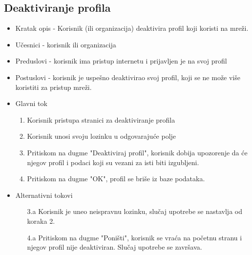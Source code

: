 \subsection{Deaktiviranje profila}
\begin{itemize}
	\item Kratak opis - Korisnik (ili organizacija) deaktivira profil koji koristi na mreži.
	\item Učesnici - korisnik ili organizacija
	\item Preduslovi - korisnik ima pristup internetu i prijavljen je na svoj profil
	\item Postuslovi - korisnik je uspešno deaktivirao svoj profil, koji se ne može više koristiti za pristup mreži.
	\item Glavni tok
		\begin{enumerate}
			\item Korisnik pristupa stranici za deaktiviranje profila
			\item Korisnik unosi svoju lozinku u odgovarajuće polje
			\item Pritiskom na dugme "Deaktiviraj profil", korisnik dobija upozorenje da će njegov profil i podaci koji su vezani za isti biti izgubljeni.
			\item Pritiskom na dugme "OK", profil se briše iz baze podataka.
		\end{enumerate}
	\item Alternativni tokovi
		\begin{itemize}
			\item[3.a] Korisnik je uneo neispravnu lozinku, slučaj upotrebe se nastavlja od koraka 2.
			\item[4.a] Pritiskom na dugme "Poništi", korisnik se vraća na početnu stranu i njegov profil nije deaktiviran. Slučaj upotrebe se završava.
		\end{itemize}
\end{itemize}




